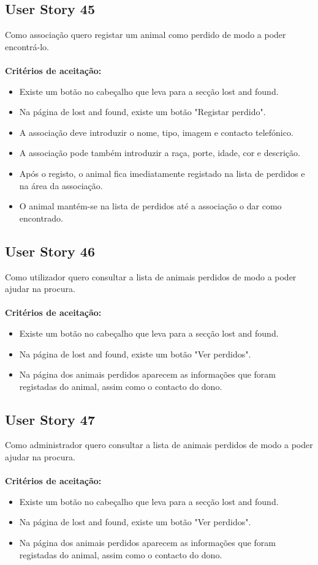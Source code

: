 \documentclass[a4paper,11pt]{article}
\begin{document}
\subsection*{User Story 45}
Como associação quero registar um animal como perdido de modo a poder encontrá-lo.\\\\
\textbf{Critérios de aceitação:}
\begin{itemize}
  \item Existe um botão no cabeçalho que leva para a secção lost and found.
  \item Na página de lost and found, existe um botão "Registar perdido".
  \item A associação deve introduzir o nome, tipo, imagem e contacto telefónico.
  \item A associação pode também introduzir a raça, porte, idade, cor e descrição.
  \item Após o registo, o animal fica imediatamente registado na lista de perdidos e na área da associação.
  \item O animal mantém-se na lista de perdidos até a associação o dar como encontrado.
\end{itemize}

\subsection*{User Story 46}
Como utilizador quero consultar a lista de animais perdidos de modo a poder ajudar na procura.\\\\
\textbf{Critérios de aceitação:}
\begin{itemize}
  \item Existe um botão no cabeçalho que leva para a secção lost and found.
  \item Na página de lost and found, existe um botão "Ver perdidos".
  \item Na página dos animais perdidos aparecem as informações que foram registadas do animal, assim como o contacto do dono.
\end{itemize}

\subsection*{User Story 47}
Como administrador quero consultar a lista de animais perdidos de modo a poder ajudar na procura.\\\\
\textbf{Critérios de aceitação:}
\begin{itemize}
  \item Existe um botão no cabeçalho que leva para a secção lost and found.
  \item Na página de lost and found, existe um botão "Ver perdidos".
  \item Na página dos animais perdidos aparecem as informações que foram registadas do animal, assim como o contacto do dono.
\end{itemize}
\end{document}
